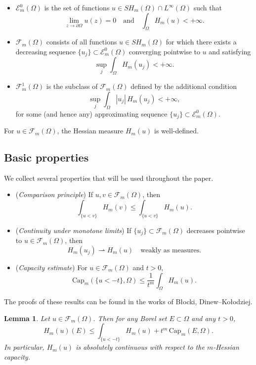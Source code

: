 \documentclass[11pt,reqno]{amsart}
\newtheorem{lemma}[theorem]{Lemma}
\theoremstyle{definition}
\theoremstyle{remark}
\begin{document}
	\begin{itemize}
		\item $\mathcal{E}_m^0(\Omega)$ is the set of functions $u \in SH_m(\Omega) \cap L^\infty(\Omega)$ such that
		\[
		\lim_{z \to \partial \Omega} u(z) = 0
		\quad \text{and} \quad
		\int_\Omega H_m(u) < +\infty.
		\]
		
		\item $\mathcal{F}_m(\Omega)$ consists of all functions $u \in SH_m(\Omega)$ for which there exists a decreasing sequence
		$\{u_j\} \subset \mathcal{E}_m^0(\Omega)$ converging pointwise to $u$ and satisfying
		\[
		\sup_j \int_\Omega H_m(u_j) < +\infty.
		\]
		
		\item $\mathcal{F}_m^1(\Omega)$ is the subclass of $\mathcal{F}_m(\Omega)$ defined by the additional condition
		\[
		\sup_j \int_\Omega |u_j| \, H_m(u_j) < +\infty,
		\]
		for some (and hence any) approximating sequence $\{u_j\} \subset \mathcal{E}_m^0(\Omega)$.
	\end{itemize}
	
	For $u \in \mathcal{F}_m(\Omega)$, the Hessian measure $H_m(u)$ is well-defined.
	
	
	\subsection{Basic properties}
	
	We collect several properties that will be used throughout the paper.
	
	\begin{itemize}
		\item (\emph{Comparison principle})
		If $u,v \in \mathcal{F}_m(\Omega)$, then
		\[
		\int_{\{u<v\}} H_m(v) \le \int_{\{u<v\}} H_m(u).
		\]
		
		\item (\emph{Continuity under monotone limits})
		If $\{u_j\} \subset \mathcal{F}_m(\Omega)$ decreases pointwise to $u \in \mathcal{F}_m(\Omega)$, then
		\[
		H_m(u_j) \rightharpoonup H_m(u)
		\quad \text{weakly as measures.}
		\]
		
		\item (\emph{Capacity estimate})\cite{DinewKolodziej2014}
		For $u \in \mathcal{F}_m(\Omega)$ and $t>0$,
		\[
		\mathrm{Cap}_m(\{u<-t\},\Omega)
		\le \frac{1}{t^m} \int_\Omega H_m(u).
		\]
	\end{itemize}
	
	The proofs of these results can be found in the works of B\l ocki, Dinew--Ko\l odziej.
	\begin{lemma}\label{lem:AC}
		Let $u\in\mathcal F_m(\Omega)$. Then for any Borel set $E\subset\Omega$ and any $t>0$,
		\[
		H_m(u)(E)
		\le
		\int_{\{u<-t\}} H_m(u)
		+
		t^m\,\mathrm{Cap}_m(E,\Omega).
		\]
		In particular, $H_m(u)$ is absolutely continuous with respect to the
		$m$-Hessian capacity.
	\end{lemma}
	
\end{document}
